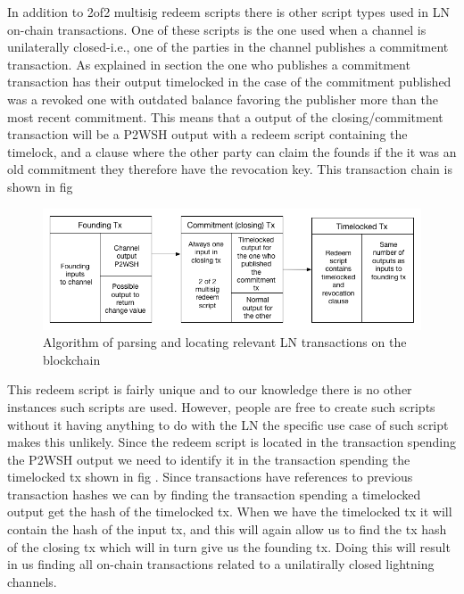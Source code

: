 
In addition to 2of2 multisig redeem scripts there is other script types used in LN on-chain transactions. One of these scripts is the one used when a channel is unilaterally closed-i.e., one of the parties in the channel publishes a commitment transaction. As explained in section  the one who publishes a commitment transaction has their output timelocked in the case of the commitment published was a revoked one with outdated balance favoring the publisher more than the most recent commitment. This means that a output of the closing/commitment transaction will be a P2WSH output with a redeem script containing the timelock, and a clause where the other party can claim the founds if the it was an old commitment they therefore have the revocation key. This transaction chain is shown in fig 

\begin{figure}[h]
    \centering
    \includegraphics[width=12cm]{figures/lnchainTimelock.png}
    \caption{Algorithm of parsing and locating relevant LN transactions on the blockchain }
    \label{fig:htlc_bc}
\end{figure}

This redeem script is fairly unique and to our knowledge there is no other instances such scripts are used. However, people are free to create such scripts without it having anything to do with the LN the specific use case of such script makes this unlikely. Since the redeem script is located in the transaction spending the P2WSH output we need to identify it in the transaction spending the timelocked tx shown in fig . Since transactions have references to previous transaction hashes  we can by finding the transaction spending a timelocked output get the hash of the timelocked tx. When we have the timelocked tx it will contain the hash of the input tx, and this will again allow us to find the tx hash of the closing tx which will in turn give us the founding tx. Doing this will result in us finding all on-chain transactions related to a unilatirally closed lightning channels.

